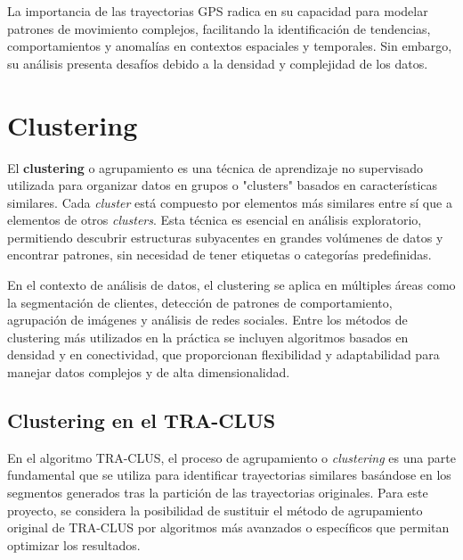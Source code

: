 La importancia de las trayectorias GPS radica en su capacidad para modelar patrones de movimiento complejos, facilitando la identificación de tendencias, comportamientos y anomalías en contextos espaciales y temporales. Sin embargo, su análisis presenta desafíos debido a la densidad y complejidad de los datos.


\section{Clustering}

El \textbf{clustering} o agrupamiento es una técnica de aprendizaje no supervisado utilizada para organizar datos en grupos o "clusters" basados en características similares. Cada \textit{cluster} está compuesto por elementos más similares entre sí que a elementos de otros \textit{clusters}. Esta técnica es esencial en análisis exploratorio, permitiendo descubrir estructuras subyacentes en grandes volúmenes de datos y encontrar patrones, sin necesidad de tener etiquetas o categorías predefinidas.

En el contexto de análisis de datos, el clustering se aplica en múltiples áreas como la segmentación de clientes, detección de patrones de comportamiento, agrupación de imágenes y análisis de redes sociales. Entre los métodos de clustering más utilizados en la práctica se incluyen algoritmos basados en densidad y en conectividad, que proporcionan flexibilidad y adaptabilidad para manejar datos complejos y de alta dimensionalidad.

\subsection*{Clustering en el TRA-CLUS}

En el algoritmo TRA-CLUS, el proceso de agrupamiento o \textit{clustering} es una parte fundamental que se utiliza para identificar trayectorias similares basándose en los segmentos generados tras la partición de las trayectorias originales. Para este proyecto, se considera la posibilidad de sustituir el método de agrupamiento original de TRA-CLUS por algoritmos más avanzados o específicos que permitan optimizar los resultados.

